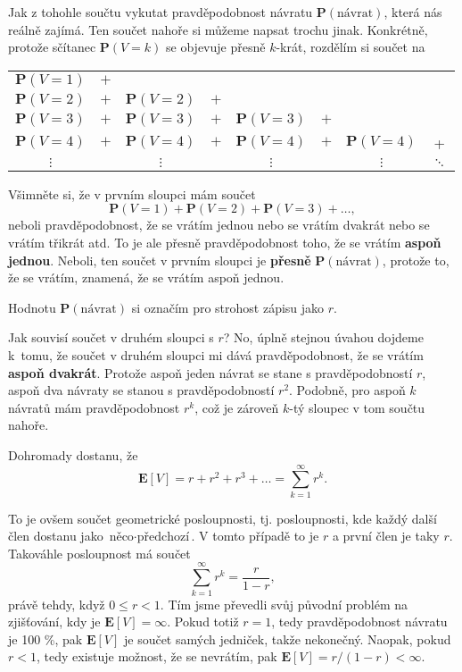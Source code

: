 \documentclass[a4paper,11pt]{article}
\theoremstyle{remark}
\renewcommand{\P}{\mathbf{P}}
\newcommand{\E}{\mathbf{E}}
\begin{document}
Jak z tohohle součtu vykutat pravděpodobnost návratu $\P(\text{návrat})$, která
nás reálně zajímá. Ten součet nahoře si můžeme napsat trochu jinak. Konkrétně,
protože sčítanec $\P(V=k)$ se objevuje přesně $k$-krát, rozdělím si součet na

\begin{center}
 \begin{tabular}{cccccccc}
  $\P(V=1)$ & $+$ & & & & & & \\[1ex]
  $\P(V=2)$ & $+$ & $\P(V=2)$ & $+$ & & & & \\[1ex]
  $\P(V=3)$ & $+$ & $\P(V=3)$ & $+$ & $\P(V=3)$ & $+$ & & \\[1ex]
  $\P(V=4)$ & $+$ & $\P(V=4)$ & $+$ & $\P(V=4)$ & $+$ & $\P(V=4)$ & + \\[1ex]
  $\vdots$ & & $\vdots$ & & $\vdots$ & & $\vdots$ & $\ddots$ \\
 \end{tabular}
\end{center}

Všimněte si, že v prvním sloupci mám součet
\[
 \P(V=1) + \P(V=2) + \P(V=3) + \ldots,
\]
neboli pravděpodobnost, že se vrátím jednou nebo se vrátím dvakrát nebo se
vrátím třikrát atd. To je ale přesně pravděpodobnost toho, že se vrátím
\textbf{aspoň jednou}. Neboli, ten součet v prvním sloupci je \textbf{přesně}
$\P(\text{návrat})$, protože to, že se vrátím, znamená, že se vrátím aspoň
jednou.

Hodnotu $\P(\text{návrat})$ si označím pro strohost zápisu jako $r$.

Jak souvisí součet v druhém sloupci s $r$? No, úplně stejnou úvahou dojdeme
k~tomu, že součet v druhém sloupci mi dává pravděpodobnost, že se vrátím
\textbf{aspoň dvakrát}. Protože aspoň jeden návrat se stane s pravděpodobností
$r$, aspoň dva návraty se stanou s pravděpodobností $r^2$. Podobně, pro aspoň
$k$ návratů mám pravděpodobnost $r^{k}$, což je zároveň $k$-tý sloupec v tom
součtu nahoře.

Dohromady dostanu, že
\[
 \E[V] = r + r^2 + r^3 +\ldots = \sum_{k=1}^{\infty} r^{k}.
\]

To je ovšem součet geometrické posloupnosti, tj. posloupnosti, kde každý další
člen dostanu jako $\text{něco} \cdot \text{předchozí}$. V tomto případě to
 je $r$ a první člen je taky $r$. Takováhle posloupnost má součet
\[
 \sum_{k=1}^{\infty} r^{k} = \frac{r}{1-r},
\]
právě tehdy, když $0 \leq r < 1$. Tím jsme převedli svůj původní problém na
zjišťování, kdy je $\E[V] = \infty$. Pokud totiž $r = 1$, tedy pravděpodobnost
návratu je 100 \%, pak $\E[V]$ je součet samých jedniček, takže nekonečný.
Naopak, pokud $r < 1$, tedy existuje možnost, že se nevrátím, pak $\E[V] = r /
(1-r)<\infty$.
\end{document}

